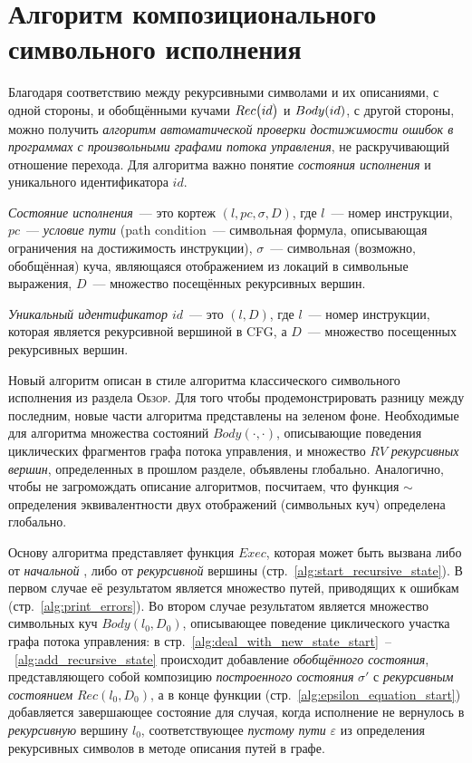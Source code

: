 \section{Алгоритм композиционального символьного исполнения}

Благодаря соответствию между рекурсивными символами и их описаниями, с одной стороны, и обобщёнными кучами $Rec\big(id\big)$ и $Body{}(id)$, с другой стороны, можно 
получить \emph{алгоритм автоматической проверки достижимости ошибок в программах с произвольными графами потока управления}, не раскручивающий отношение перехода. Для алгоритма важно понятие \emph{состояния исполнения} и уникального идентификатора $id$.

\begin{defn}
\emph{Состояние исполнения}~--- это кортеж $(l,pc,\sigma,D)$, где $l$~--- номер инструкции,
$pc$~--- \emph{условие пути} (path condition~--- символьная формула, описывающая ограничения на достижимость инструкции), $\sigma$~--- символьная (возможно, обобщённая) куча, являющаяся отображением из локаций в символьные выражения, $D$~--- множество посещённых рекурсивных вершин.

\emph{Уникальный идентификатор $id$}~--- это $(l,D)$, где $l$~--- номер инструкции, которая является рекурсивной вершиной в CFG, а $D$~--- множество посещенных рекурсивных вершин.
\end{defn}

Новый алгоритм описан в стиле алгоритма классического символьного исполнения из раздела \textsc{Обзор}. Для того чтобы продемонстрировать разницу между последним, новые части алгоритма представлены на зеленом фоне. Необходимые для алгоритма множества состояний $Body(\cdot,\cdot)$, описывающие поведения циклических фрагментов графа потока управления, и множество $RV$ \emph{рекурсивных вершин}, определенных в прошлом разделе, объявлены глобально. Аналогично, чтобы не загромождать описание алгоритмов, посчитаем, что функция $\sim$ определения эквивалентности двух отображений (символьных куч) определена глобально.

Основу алгоритма представляет функция $Exec$, которая может быть вызвана либо от \emph{начальной} , 
либо от \emph{рекурсивной} вершины (стр.~\ref{alg:start_recursive_state}). В первом случае её результатом является  множество путей, приводящих к ошибкам (стр.~\ref{alg:print_errors}).
Во втором случае результатом является множество символьных куч $Body(l_0,D_0)$, описывающее поведение циклического участка графа потока управления:
в стр.~\ref{alg:deal_with_new_state_start}~--~\ref{alg:add_recursive_state} 
происходит добавление \emph{обобщённого состояния}, представляющего собой композицию \emph{построенного состояния} $\sigma'$ с \emph{рекурсивным состоянием} $Rec(l_0,D_0)$, 
а в конце функции (стр.~\ref{alg:epsilon_equation_start}) добавляется завершающее состояние для случая, 
когда исполнение не вернулось в \emph{рекурсивную} вершину $l_0$,
соответствующее \emph{пустому пути} $\varepsilon$ из определения рекурсивных символов в методе описания путей в графе.


